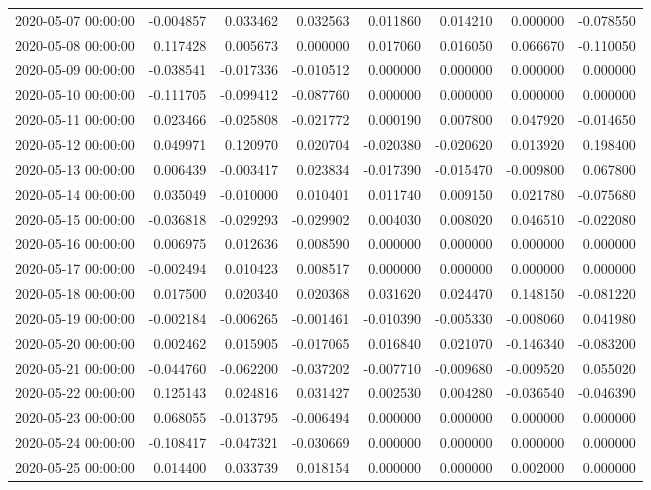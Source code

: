\begin{tabular}{lrrrrrrr}
2020-05-07 00:00:00 & -0.004857 & 0.033462 & 0.032563 & 0.011860 & 0.014210 & 0.000000 & -0.078550 \\
2020-05-08 00:00:00 & 0.117428 & 0.005673 & 0.000000 & 0.017060 & 0.016050 & 0.066670 & -0.110050 \\
2020-05-09 00:00:00 & -0.038541 & -0.017336 & -0.010512 & 0.000000 & 0.000000 & 0.000000 & 0.000000 \\
2020-05-10 00:00:00 & -0.111705 & -0.099412 & -0.087760 & 0.000000 & 0.000000 & 0.000000 & 0.000000 \\
2020-05-11 00:00:00 & 0.023466 & -0.025808 & -0.021772 & 0.000190 & 0.007800 & 0.047920 & -0.014650 \\
2020-05-12 00:00:00 & 0.049971 & 0.120970 & 0.020704 & -0.020380 & -0.020620 & 0.013920 & 0.198400 \\
2020-05-13 00:00:00 & 0.006439 & -0.003417 & 0.023834 & -0.017390 & -0.015470 & -0.009800 & 0.067800 \\
2020-05-14 00:00:00 & 0.035049 & -0.010000 & 0.010401 & 0.011740 & 0.009150 & 0.021780 & -0.075680 \\
2020-05-15 00:00:00 & -0.036818 & -0.029293 & -0.029902 & 0.004030 & 0.008020 & 0.046510 & -0.022080 \\
2020-05-16 00:00:00 & 0.006975 & 0.012636 & 0.008590 & 0.000000 & 0.000000 & 0.000000 & 0.000000 \\
2020-05-17 00:00:00 & -0.002494 & 0.010423 & 0.008517 & 0.000000 & 0.000000 & 0.000000 & 0.000000 \\
2020-05-18 00:00:00 & 0.017500 & 0.020340 & 0.020368 & 0.031620 & 0.024470 & 0.148150 & -0.081220 \\
2020-05-19 00:00:00 & -0.002184 & -0.006265 & -0.001461 & -0.010390 & -0.005330 & -0.008060 & 0.041980 \\
2020-05-20 00:00:00 & 0.002462 & 0.015905 & -0.017065 & 0.016840 & 0.021070 & -0.146340 & -0.083200 \\
2020-05-21 00:00:00 & -0.044760 & -0.062200 & -0.037202 & -0.007710 & -0.009680 & -0.009520 & 0.055020 \\
2020-05-22 00:00:00 & 0.125143 & 0.024816 & 0.031427 & 0.002530 & 0.004280 & -0.036540 & -0.046390 \\
2020-05-23 00:00:00 & 0.068055 & -0.013795 & -0.006494 & 0.000000 & 0.000000 & 0.000000 & 0.000000 \\
2020-05-24 00:00:00 & -0.108417 & -0.047321 & -0.030669 & 0.000000 & 0.000000 & 0.000000 & 0.000000 \\
2020-05-25 00:00:00 & 0.014400 & 0.033739 & 0.018154 & 0.000000 & 0.000000 & 0.002000 & 0.000000 \\

\end{tabular}
